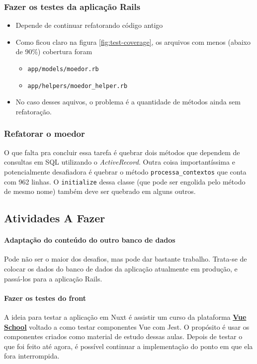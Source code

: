 \subsubsection{Fazer os testes da aplicação Rails}

\begin{itemize}
  \item Depende de continuar refatorando código antigo
  \item Como ficou claro na figura \ref{fig:test-coverage}, os arquivos com menos (abaixo de 90\%) cobertura foram
  \begin{itemize}
    \item \texttt{app/models/moedor.rb}
    \item \texttt{app/helpers/moedor\_helper.rb}
  \end{itemize}
  \item No caso desses aquivos, o problema é a quantidade de métodos ainda sem refatoração.
\end{itemize}

\subsubsection{Refatorar o moedor}

O que falta pra concluir essa tarefa é quebrar dois métodos que dependem de consultas em SQL utilizando o
\emph{ActiveRecord}. Outra coisa importantíssima e potencialmente desafiadora é quebrar o método
\texttt{processa\_contextos} que conta com 962 linhas. O \texttt{initialize}  dessa classe (que pode ser engolida pelo
método de mesmo nome) também deve ser quebrado em alguns outros.

\subsection{Atividades A Fazer}\label{subsec:to-do}

\paragraph{Adaptação do conteúdo do outro banco de dados} Pode não ser o maior dos desafios, mas pode dar
bastante trabalho. Trata-se de colocar os dados do banco de dados da aplicação atualmente em produção, e
passá-los para a aplicação Rails.

\paragraph{Fazer os testes do front} A ideia para testar a aplicação em Nuxt é assistir um curso da plataforma
\href{https://vueschool.io/}{\textbf{Vue School}} voltado a como testar componentes Vue com Jest. O propósito é
usar os componentes criados como material de estudo dessas aulas. Depois de testar o que foi feito até agora, é
possível continuar a implementação do ponto em que ela fora interrompida.

